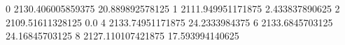 0 2130.406005859375 20.889892578125
1 2111.949951171875 2.433837890625
2 2109.51611328125 0.0
4 2133.74951171875 24.2333984375
6 2133.6845703125 24.16845703125
8 2127.110107421875 17.593994140625

